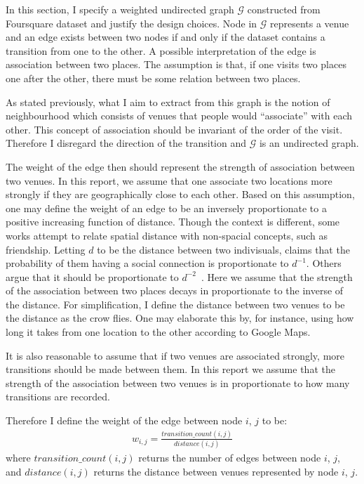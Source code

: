 In this section, I specify a weighted undirected graph $\mathcal{G}$ constructed from Foursquare dataset and justify the design choices.
Node in $\mathcal{G}$ represents a venue and an edge exists between two nodes if and only if the dataset contains a transition from one to the other.
A possible interpretation of the edge is association between two places. The assumption is that, if one visits two places one after the other, there must be some relation between two places.

As stated previously, what I aim to extract from this graph is the notion of neighbourhood which consists of venues that people would ``associate'' with each other. This concept of association should be invariant of the order of the visit. Therefore I disregard the direction of the transition and $\mathcal{G}$ is an undirected graph.

The weight of the edge then should represent the strength of association between two venues. In this report, we assume that one associate two locations more strongly if they are geographically close to each other. Based on this assumption, one may define the weight of an edge to be an inversely proportionate to a positive increasing function of distance. 
Though the context is different, some works attempt to relate spatial distance with non-spacial concepts, such as friendship. Letting $d$ to be the distance between two indivisuals, \cite{backstrom2010find} claims that the probability of them having a social connection is proportionate to $d^{-1}$. Others argue that it should be proportionate to $d^{-2}$~\citep{lambiotte2008geographical}. Here we assume that the strength of the association between two places decays in proportionate to the inverse of the distance.  For simplification, I define the distance between two venues to be the distance as the crow flies. One may elaborate this by, for instance, using how long it takes from one location to the other according to Google Maps.

It is also reasonable to assume that if two venues are associated strongly, more transitions should be made between them. In this report we assume that the strength of the association between two venues is in proportionate to how many transitions are recorded.

Therefore I define the weight of the edge between node $i$, $j$ to be:
\begin{align*}
w_{i, j} = \frac{transition\_count(i, j)}{distance(i, j)}
\end{align*}
where $transition\_count(i, j)$ returns the number of edges between node $i$, $j$, and $distance(i, j)$ returns the distance between venues represented by node $i$, $j$.